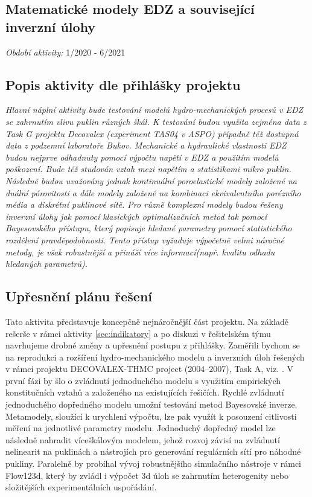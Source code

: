 \documentclass[11pt,a4paper]{article}
\newcommand{\sy}[1]{{\color{blue} SS: #1}}
\begin{document}
\begin{onehalfspacing}

\section{ Matematické modely EDZ a související inverzní úlohy}
\label{sec:hm_modely}
 {\it Období aktivity:}  1/2020 - 6/2021
\subsection{Popis aktivity dle přihlášky projektu}
{\it 
Hlavní náplní aktivity bude testování modelů hydro-mechanických procesů v EDZ se zahrnutím vlivu puklin různých škál. K testování budou využita zejména data z Task G projektu Decovalex (experiment TAS04 v ASPO) případně též dostupná data z podzemní
laboratoře Bukov. Mechanické a hydraulické vlastnosti EDZ budou nejprve odhadnuty pomocí výpočtu napětí v EDZ a použitím modelů poškození. Bude též studován vztah mezi napětím a statistikami mikro puklin. Následně budou uvažovány jednak kontinuální poroelastické modely založené na duální pórovitosti a dále modely založené na kombinaci ekvivalentního porézního média a diskrétní puklinové sítě. Pro různě komplexní modely budou řešeny inverzní úlohy jak pomocí klasických optimalizačních metod tak pomocí
Bayesovského přístupu, který popisuje hledané parametry pomocí statistického rozdělení pravděpodobnosti. Tento přístup vyžaduje výpočetně velmi náročné metody, je však robustnější a přináší více informací(např. kvalitu odhadu hledaných parametrů).}

\subsection{Upřesnění plánu řešení}
Tato aktivita představuje koncepčně nejnáročnější část projektu. Na základě rešerše v rámci aktivity \ref{sec:indikatory} 
a po diskuzi v řešitelském týmu navrhujeme drobné změny a upřesnění postupu z přihlášky. Zaměřili bychom se na reprodukci a rozšíření 
hydro-mechanického modelu a inverzních úloh řešených v rámci projektu DECOVALEX-THMC project (2004–2007), Task A, viz. \cite{Rutqvist2009}. 
V první fázi by šlo o zvládnutí jednoduchého modelu s využitím empirických konstitučních vztahů a založeného na existujících řešičích. 
Rychlé zvládnutí jednoduchého dopředného modelu umožní testování metod Bayesovské inverze. Metamodely, sloužící k urychlení 
výpočtu, lze pak využít k posouzení citlivosti měření na jednotlivé parametry modelu. Jednoduchý dopředný model lze následně nahradit 
víceškálovým modelem, jehož rozvoj závisí na zvládnutí nelinearit na puklinách a nástrojích pro generování regulárních sítí pro náhodné pukliny.  
Paralelně by probíhal vývoj robustnějšího simulačního nástroje v rámci Flow123d,
který by zvládl i výpočet 3d úloh se zahrnutím heterogenity nebo složitějších experimentálních uspořádání.


\end{onehalfspacing}
\end{document}
